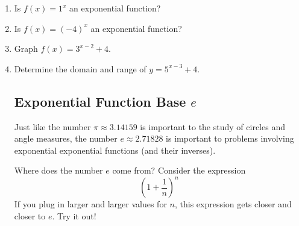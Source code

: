 \begin{enumerate}

\item Is $f(x)=1^x$ an exponential function?\\[.5in]



\item Is $f(x)=(-4)^x$ an exponential function?\\


\newpage
\item Graph $f(x)=3^{x-2}+4.$


\item Determine the domain and range of $y=5^{x-3}+4$.  \\[1in]





\subsection{Exponential Function Base $e$} 
Just like the number $\pi \approx 3.14159$ is important to the study
of circles and angle measures, the number $e \approx 2.71828$ is
important to problems involving exponential exponential functions (and
their inverses).

Where does the number $e$ come from? Consider the
expression $$\left(1+\frac{1}{n}\right)^n$$ If you plug in larger and
larger values for $n$, this expression gets closer and closer to $e$.
Try it out!


\end{enumerate}
